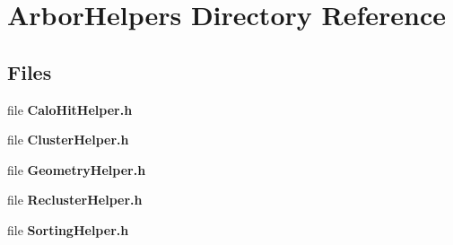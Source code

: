 \section{Arbor\+Helpers Directory Reference}
\label{dir_65336723902482652a09bf3f09483cc3}
\subsection*{Files}
\begin{DoxyCompactItemize}
\item 
file {\bf Calo\+Hit\+Helper.\+h}
\item 
file {\bf Cluster\+Helper.\+h}
\item 
file {\bf Geometry\+Helper.\+h}
\item 
file {\bf Recluster\+Helper.\+h}
\item 
file {\bf Sorting\+Helper.\+h}
\end{DoxyCompactItemize}
